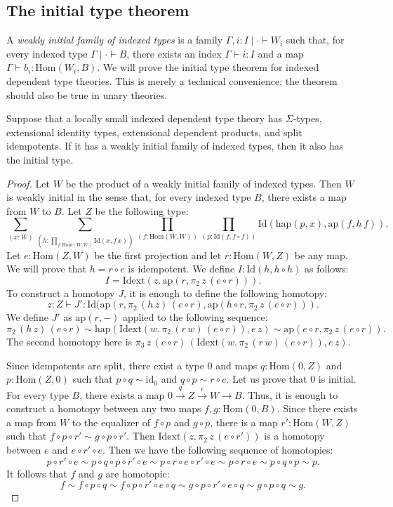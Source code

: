\documentclass[reqno]{amsart}
\theoremstyle{definition}
\theoremstyle{remark}
\newcommand{\ob}{}
\newcommand{\fs}[1]{\mathrm{#1}}
\newcommand{\Hom}{\fs{Hom}}
\newcommand{\Id}{\fs{Id}}
\newcommand{\id}{\fs{id}}
\newcommand{\pmap}{\fs{ap}}
\numberwithin{figure}{section}
\begin{document}
\subsection{The initial type theorem}

A \emph{weakly initial family of indexed types} is a family $\Gamma, i : I \mid \cdot \vdash W_i \ob$ such that, for every indexed type $\Gamma \mid \cdot \vdash B \ob$, there exists an index $\Gamma \vdash i : I$ and a map $\Gamma \vdash b_i : \Hom(W_i,B)$.
We will prove the initial type theorem for indexed dependent type theories.
This is merely a technical convenience; the theorem should also be true in unary theories.

\begin{thm}
Suppose that a locally small indexed dependent type theory has $\Sigma$-types, extensional identity types, extensional dependent products, and split idempotents.
If it has a weakly initial family of indexed types, then it also has the initial type.
\end{thm}
\begin{proof}
Let $W$ be the product of a weakly initial family of indexed types.
Then $W$ is weakly initial in the sense that, for every indexed type $B$, there exists a map from $W$ to $B$.
Let $Z$ be the following type:
\[ \sum_{(x : W)} \sum_{(h : \prod_{f : \Hom(W,W)} \Id(x,f\,x))} \prod_{(f : \Hom(W,W))} \prod_{(p : \Id(f, f \circ f))} \Id(\fs{hap}(p,x),\pmap(f,h\,f)). \]
Let $e : \Hom(Z,W)$ be the first projection and let $r : \Hom(W,Z)$ be any map.
We will prove that $h = r \circ e$ is idempotent.
We define $I : \Id(h, h \circ h)$ as follows:
\[ I = \fs{Idext}(z.\,\pmap(r, \pi_2\,z\,(e \circ r))). \]
To construct a homotopy $J$, it is enough to define the following homotopy:
\[ z : Z \vdash J' : \Id(\pmap(r, \pi_2\,(h\,z)\,(e \circ r), \pmap(h \circ r, \pi_2\,z\,(e \circ r))). \]
We define $J'$ as $\pmap(r,-)$ applied to the following sequence:
\[ \pi_2\,(h\,z)\,(e \circ r) \sim \fs{hap}(\fs{Idext}(w.\,\pi_2\,(r\,w)\,(e \circ r)),e\,z) \sim \pmap(e \circ r, \pi_2\,z\,(e \circ r)). \]
The second homotopy here is $\pi_3\,z\,(e \circ r)\,(\fs{Idext}(w.\,\pi_2\,(r\,w)\,(e \circ r)),e\,z)$.

Since idempotents are split, there exist a type $0$ and maps $q : \Hom(0,Z)$ and $p : \Hom(Z,0)$ such that $p \circ q \sim \id_0$ and $q \circ p \sim r \circ e$.
Let us prove that $0$ is initial.
For every type $B$, there exists a map $0 \xrightarrow{q} Z \xrightarrow{e} W \to B$.
Thus, it is enough to construct a homotopy between any two maps $f,g : \Hom(0,B)$.
Since there exists a map from $W$ to the equalizer of $f \circ p$ and $g \circ p$, there is a map $r' : \Hom(W,Z)$ such that $f \circ p \circ r' \sim g \circ p \circ r'$.
Then $\fs{Idext}(z.\,\pi_2\,z\,(e \circ r'))$ is a homotopy between $e$ and $e \circ r' \circ e$.
Then we have the following sequence of homotopies:
\[ p \circ r' \circ e \sim p \circ q \circ p \circ r' \circ e \sim p \circ r \circ e \circ r' \circ e \sim p \circ r \circ e \sim p \circ q \circ p \sim p. \]
It follows that $f$ and $g$ are homotopic:
\[ f \sim f \circ p \circ q \sim f \circ p \circ r' \circ e \circ q \sim g \circ p \circ r' \circ e \circ q \sim g \circ p \circ q \sim g. \]
\end{proof}
\end{document}
